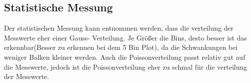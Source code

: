 \subsection{Statistische Messung}
Der statistischen Messung kann entnommen werden, dass die verteilung der Messwerte eher einer Gauss-
Verteilung. Je Größer die Bins, desto besser ist das erkennbar(Besser zu erkennen bei dem 5 Bin Plot), da die Schwankungen bei weniger Balken kleiner werden.
Auch die Poissonverteilung passt relativ gut auf die Messwerte, jedoch ist die Poissonverteilung eher zu schmal 
für die verteilung der Messwerte. 